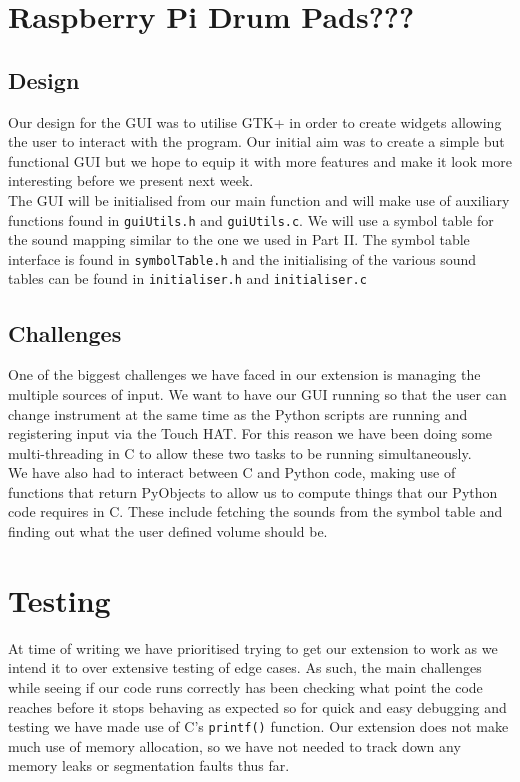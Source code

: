 \documentclass[11pt]{article}
\begin{document}
\section{Raspberry Pi Drum Pads???}

\subsection{Design}
	Our design for the GUI was to utilise GTK+ in order to create widgets allowing the user to interact with the program. Our initial aim was to create a simple but functional GUI but we hope to equip it with more features and make it look more interesting before we present next week. 
	\\
	
	The GUI will be initialised from our main function and will make use of auxiliary functions found in \texttt{guiUtils.h} and \texttt{guiUtils.c}. We will use a symbol table for the sound mapping similar to the one we used in Part II. The symbol table interface is found in \texttt{symbolTable.h} and the initialising of the various sound tables can be found in \texttt{initialiser.h} and \texttt{initialiser.c}

\subsection{Challenges}
	One of the biggest challenges we have faced in our extension is managing the multiple sources of input. We want to have our GUI running so that the user can change instrument at the same time as the Python scripts are running and registering input via the Touch HAT. For this reason we have been doing some multi-threading in C to allow these two tasks to be running simultaneously.\\
	
	We have also had to interact between C and Python code, making use of functions that return PyObjects to allow us to compute things that our Python code requires in C. These include fetching the sounds from the symbol table and finding out what the user defined volume should be.

\section{Testing}
	At time of writing we have prioritised trying to get our extension to work as we intend it to over extensive testing of edge cases. As such, the main challenges while seeing if our code runs correctly has been checking what point the code reaches before it stops behaving as expected so for quick and easy debugging and testing we have made use of C's  \texttt{printf()} function. Our extension does not make much use of memory allocation, so we have not needed to track down any memory leaks or segmentation faults thus far.
\end{document}
